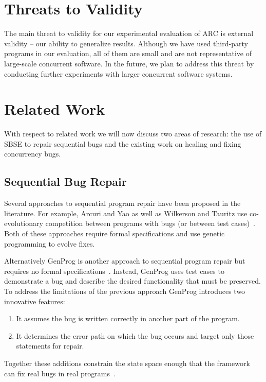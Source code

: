 \documentclass[runningheads,a4paper]{llncs}
\begin{document}
\section{Threats to Validity}
\label{sec:threats}

The main threat to validity for our experimental evaluation of ARC is external validity -- our ability to generalize results. Although we have used third-party programs in our evaluation, all of them are small and are not representative of large-scale concurrent software. In the future, we plan to address this threat by conducting further experiments with larger concurrent software systems.

\section{Related Work}
\label{sec:related_works}

With respect to related work we will now discuss two areas of research: the use of SBSE to repair sequential bugs and the existing work on healing and fixing concurrency bugs.

\subsection{Sequential Bug Repair}

Several approaches to sequential program repair have been proposed in the literature. For example, Arcuri and Yao as well as Wilkerson and Tauritz use co-evolutionary competition between programs with bugs (or between test cases)~\cite{AY08, Arc08, WT10}.  Both of these approaches require formal specifications and use genetic programming to evolve fixes. 

Alternatively GenProg is another approach to sequential program repair but requires no formal specifications~\cite{FNWG09}. Instead, GenProg uses test cases to demonstrate a bug and describe the desired functionality that must be preserved. To address the limitations of the previous approach GenProg introduces two innovative features:

\begin{enumerate}
\item It assumes the bug is written correctly in another part of the program.
\item It determines the error path on which the bug occurs and target only those statements  for repair. 
\end{enumerate}

Together these additions constrain the state space enough that the framework can fix real bugs in real programs~\cite{FNWG09, WNLF09, NWLF09, WFGN10, GNFW11, LDFW12}.
\end{document}
